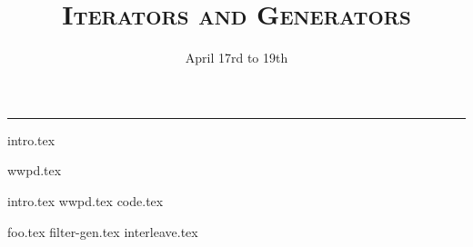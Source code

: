 \documentclass{exam}
\title{\textsc{Iterators and Generators}}
\date{April 17rd to 19th}
\begin{document}
\maketitle
\rule{\textwidth}{0.15em}
\fontsize{12}{15}\selectfont


{intro.tex}
\begin{questions}
{wwpd.tex}

\newpage

{intro.tex}
\newpage
{wwpd.tex}
{code.tex}

\newpage
{foo.tex}
\newpage
{filter-gen.tex}
\newpage
{interleave.tex}

\end{questions}
\end{document}
